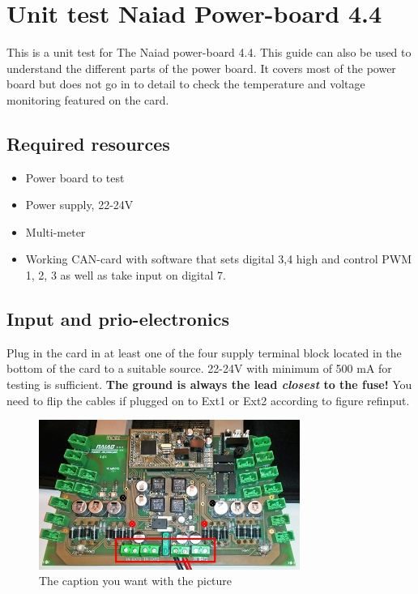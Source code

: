 \section{Unit test Naiad Power-board 4.4}
\label{Unit_PSU}
\label{A_powerboard}
This is a unit test for The Naiad power-board 4.4. This guide can also be used to understand the different parts of the power board. It covers most of the power board but does not go in to detail to check the temperature and voltage monitoring featured on the card. 
\subsection {Required resources}
\begin{itemize}
\item Power board to test
\item Power supply, 22-24V
\item Multi-meter
\item Working CAN-card with software that sets digital 3,4 high and control PWM 1, 2, 3 as well as take input on digital 7.
\end{itemize}

\newpage
\subsection{Input and prio-electronics}
Plug in the card in at least one of the four supply terminal block located in the bottom of the card to a suitable source. 22-24V with minimum of 500 mA for testing is sufficient. \textbf{The ground is always the lead \emph{closest} to the fuse!} You need to flip the cables if plugged on to Ext1 or Ext2 according to figure ref{input}.


\begin{figure}[!ht]
	\begin{center}
		\includegraphics[width=0.76\textwidth]{./Images/Unit_test_power_board/Input.jpg}
		\caption{The caption you want with the picture}
		\label{input}
	\end{center}
\end{figure}

